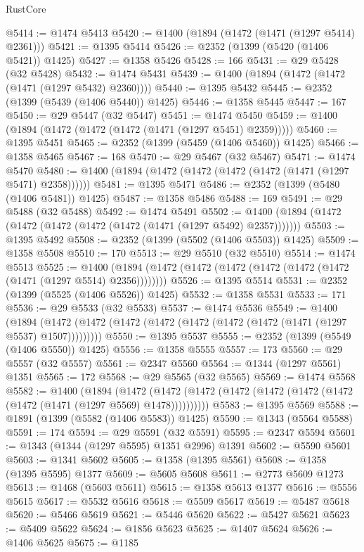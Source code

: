 \begin{lexlean}{RustCore}
\begin{coremodule}
@5414 := @1474 @5413
@5420 := @1400 (@1894 (@1472 (@1471 (@1297 @5414) @2361)))
@5421 := @1395 @5414
@5426 := @2352 (@1399 (@5420 (@1406 @5421)) @1425)
@5427 := @1358 @5426
@5428 := 166
@5431 := @29 @5428 (@32 @5428)
@5432 := @1474 @5431
@5439 := @1400 (@1894 (@1472 (@1472 (@1471 (@1297 @5432) @2360))))
@5440 := @1395 @5432
@5445 := @2352 (@1399 (@5439 (@1406 @5440)) @1425)
@5446 := @1358 @5445
@5447 := 167
@5450 := @29 @5447 (@32 @5447)
@5451 := @1474 @5450
@5459 := @1400 (@1894 (@1472 (@1472 (@1472 (@1471 (@1297 @5451) @2359)))))
@5460 := @1395 @5451
@5465 := @2352 (@1399 (@5459 (@1406 @5460)) @1425)
@5466 := @1358 @5465
@5467 := 168
@5470 := @29 @5467 (@32 @5467)
@5471 := @1474 @5470
@5480 := @1400 (@1894 (@1472 (@1472 (@1472 (@1472 (@1471 (@1297 @5471) @2358))))))
@5481 := @1395 @5471
@5486 := @2352 (@1399 (@5480 (@1406 @5481)) @1425)
@5487 := @1358 @5486
@5488 := 169
@5491 := @29 @5488 (@32 @5488)
@5492 := @1474 @5491
@5502 := @1400 (@1894 (@1472 (@1472 (@1472 (@1472 (@1472 (@1471 (@1297 @5492) @2357)))))))
@5503 := @1395 @5492
@5508 := @2352 (@1399 (@5502 (@1406 @5503)) @1425)
@5509 := @1358 @5508
@5510 := 170
@5513 := @29 @5510 (@32 @5510)
@5514 := @1474 @5513
@5525 := @1400 (@1894 (@1472 (@1472 (@1472 (@1472 (@1472 (@1472 (@1471 (@1297 @5514) @2356))))))))
@5526 := @1395 @5514
@5531 := @2352 (@1399 (@5525 (@1406 @5526)) @1425)
@5532 := @1358 @5531
@5533 := 171
@5536 := @29 @5533 (@32 @5533)
@5537 := @1474 @5536
@5549 := @1400
    (@1894 (@1472 (@1472 (@1472 (@1472 (@1472 (@1472 (@1472 (@1471 (@1297 @5537) @1507)))))))))
@5550 := @1395 @5537
@5555 := @2352 (@1399 (@5549 (@1406 @5550)) @1425)
@5556 := @1358 @5555
@5557 := 173
@5560 := @29 @5557 (@32 @5557)
@5561 := @2347 @5560
@5564 := @1344 (@1297 @5561) @1351
@5565 := 172
@5568 := @29 @5565 (@32 @5565)
@5569 := @1474 @5568
@5582 := @1400
    (@1894
      (@1472 (@1472 (@1472 (@1472 (@1472 (@1472 (@1472 (@1472 (@1471 (@1297 @5569) @1478))))))))))
@5583 := @1395 @5569
@5588 := @1891 (@1399 (@5582 (@1406 @5583)) @1425)
@5590 := @1343 (@5564 @5588)
@5591 := 174
@5594 := @29 @5591 (@32 @5591)
@5595 := @2347 @5594
@5601 := @1343 (@1344 (@1297 @5595) @1351 @2996) @1391
@5602 := @5590 @5601
@5603 := @1341 @5602
@5605 := @1358 (@1395 @5561)
@5608 := @1358 (@1395 @5595) @1377
@5609 := @5605 @5608
@5611 := @2773 @5609 @1273
@5613 := @1468 (@5603 @5611)
@5615 := @1358 @5613 @1377
@5616 := @5556 @5615
@5617 := @5532 @5616
@5618 := @5509 @5617
@5619 := @5487 @5618
@5620 := @5466 @5619
@5621 := @5446 @5620
@5622 := @5427 @5621
@5623 := @5409 @5622
@5624 := @1856 @5623
@5625 := @1407 @5624
@5626 := @1406 @5625
@5675 := @1185

\end{coremodule}
\end{lexlean}
